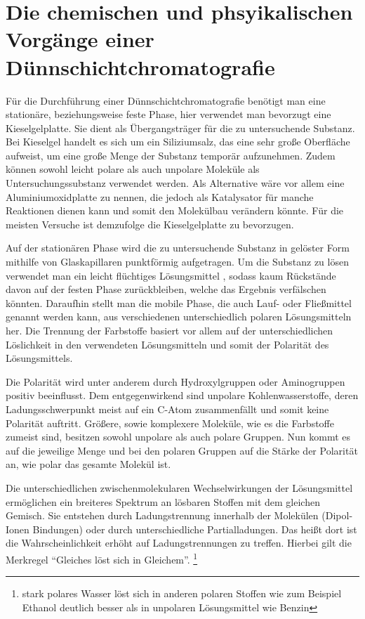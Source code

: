 \documentclass[11pt]{scrreprt}
\begin{document}
 \section{Die chemischen und phsyikalischen Vorgänge einer Dünnschichtchromatografie}
 Für die Durchführung einer Dünnschichtchromatografie benötigt man eine stationäre, beziehungsweise feste Phase, hier verwendet man bevorzugt eine Kieselgelplatte. Sie dient als Übergangsträger für die zu untersuchende Substanz.
Bei Kieselgel handelt es sich um ein Siliziumsalz, das eine sehr große Oberfläche aufweist, um eine große Menge der Substanz temporär aufzunehmen. Zudem können sowohl leicht polare als auch unpolare Moleküle als Untersuchungssubstanz verwendet werden. Als Alternative wäre vor allem eine Aluminiumoxidplatte zu nennen, die jedoch als Katalysator für manche Reaktionen dienen kann und somit den Molekülbau verändern könnte. Für die meisten Versuche ist demzufolge die Kieselgelplatte zu bevorzugen.

Auf der stationären Phase wird die zu untersuchende Substanz in gelöster Form mithilfe von Glaskapillaren punktförmig aufgetragen. Um die Substanz zu lösen verwendet man ein leicht flüchtiges Lösungsmittel , sodass kaum Rückstände davon auf der festen Phase zurückbleiben, welche das Ergebnis verfälschen könnten. Daraufhin stellt man die mobile Phase, die auch Lauf- oder Fließmittel genannt werden kann, aus verschiedenen unterschiedlich polaren Lösungsmitteln her. Die Trennung der Farbstoffe basiert vor allem auf der unterschiedlichen Löslichkeit in den verwendeten Lösungsmitteln und somit der Polarität des Lösungsmittels. 

Die Polarität wird unter anderem durch Hydroxylgruppen oder Aminogruppen positiv beeinflusst. Dem entgegenwirkend sind unpolare Kohlenwasserstoffe, deren Ladungsschwerpunkt meist auf ein C-Atom zusammenfällt und somit keine Polarität auftritt. Größere, sowie komplexere Moleküle, wie es die Farbstoffe zumeist sind, besitzen sowohl unpolare als auch polare Gruppen. Nun kommt es auf die jeweilige Menge und  bei den polaren Gruppen auf die Stärke der Polarität an, wie polar das gesamte Molekül ist.


Die unterschiedlichen zwischenmolekularen Wechselwirkungen der Lösungsmittel ermöglichen ein breiteres Spektrum an lösbaren Stoffen mit dem gleichen Gemisch. Sie entstehen durch Ladungstrennung innerhalb der Molekülen (Dipol-Ionen Bindungen) oder durch unterschiedliche Partialladungen. 
Das heißt dort ist die Wahrscheinlichkeit erhöht auf Ladungstrennungen zu treffen. 
Hierbei gilt die Merkregel \enquote{Gleiches löst sich in Gleichem}. \footnote{stark polares Wasser löst sich in anderen polaren Stoffen wie zum Beispiel Ethanol deutlich besser als in unpolaren Lösungsmittel wie Benzin} 
\end{document}
